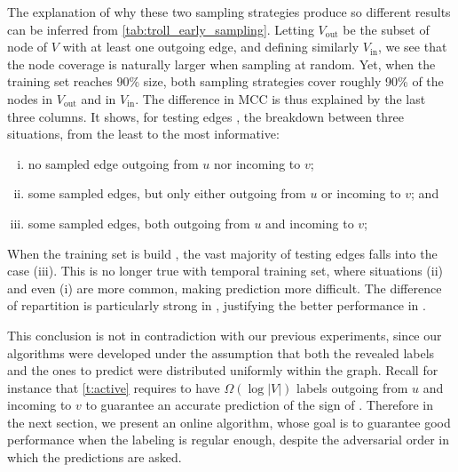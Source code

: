 The explanation of
why these two sampling strategies produce so different results can be inferred from
\autoref{tab:troll_early_sampling}. Letting $V_{\mathrm{out}}$ be the subset of node of $V$ with at
least one outgoing edge, and defining similarly $V_{\mathrm{in}}$, we see that the node coverage is
naturally larger when sampling at random. Yet, when the training set reaches 90\% size, both
sampling strategies cover roughly 90\% of the nodes in $V_{\mathrm{out}}$ and in
$V_{\mathrm{in}}$. The difference in MCC is thus explained by the last three columns. It shows, for
testing edges \euv{}, the breakdown between three situations, from the least to the most
informative:
\begin{enumerate}[(i),nosep]
  \item no sampled edge outgoing from $u$ nor incoming to $v$;
  \item some sampled edges, but only either outgoing from $u$ or incoming to $v$; and
  \item some sampled edges, both outgoing from $u$ and incoming to $v$;
\end{enumerate}
When the training set is build \uar{}, the vast majority of testing edges falls into the case (iii).
This is no longer true with temporal training set, where situations (ii) and even (i) are more
common, making prediction more difficult. The difference of repartition is particularly strong in
\wik{}, justifying the better performance in \epi{}.

This conclusion is not in contradiction with our previous experiments, since our algorithms were
developed under the assumption that both the revealed labels and the ones to predict were
distributed uniformly within the graph. Recall for instance that \autoref{t:active} requires to have
$\Omega(\log |V|)$ labels outgoing from $u$ and incoming to $v$ to guarantee an accurate prediction
of the sign of \euv{}. Therefore in the next section, we present an online algorithm, whose goal is
to guarantee good performance when the labeling is regular enough, despite the adversarial order in
which the predictions are asked.


